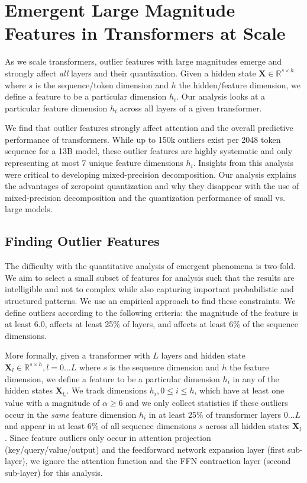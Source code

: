 \documentclass{article}
\begin{document}
\section{Emergent Large Magnitude Features in Transformers at Scale}
\label{sec:emergence}

As we scale transformers, outlier features with large magnitudes emerge and strongly affect {\it all} layers and their quantization. Given a hidden state $\mathbf{X}\in \mathbb{R}^{s\times h}$ where $s$ is the sequence/token dimension and $h$ the hidden/feature dimension, we define a feature to be a particular dimension $h_i$. Our analysis looks at a particular feature dimension $h_i$ across all layers of a given transformer.

We find that outlier features strongly affect attention and the overall predictive performance of transformers. While up to 150k outliers exist per 2048 token sequence for a 13B model, these outlier features are highly systematic and only representing at most 7 unique feature dimensions $h_i$. Insights from this analysis were critical to developing mixed-precision decomposition. Our analysis explains the advantages of zeropoint quantization and why they disappear with the use of mixed-precision decomposition and the quantization performance of small vs. large models.

\subsection{Finding Outlier Features}
\vspace{-0.5em}

The difficulty with the quantitative analysis of emergent phenomena is two-fold. We aim to select a small subset of features for analysis such that the results are intelligible and not to complex while also capturing important probabilistic and structured patterns. We use an empirical approach to find these constraints.
We define outliers according to the following criteria: the magnitude of the feature is at least 6.0, affects at least 25\% of layers, and affects at least 6\% of the sequence dimensions. 

More formally, given a transformer with $L$ layers and hidden state $\mathbf{X}_l\in \mathbb{R}^{s\times h}, l=0...L$ where $s$ is the sequence dimension and $h$ the feature dimension, we define a feature to be a particular dimension $h_i$ in any of the hidden states $\mathbf{X}_{l_{i}}$. We track dimensions $h_i, 0 \leq i \leq h$, which have at least one value with a magnitude of $\alpha\geq6$ and we only collect statistics if these outliers occur in the {\it same} feature dimension $h_i$ in at least 25\% of transformer layers $0...L$ and appear in at least 6\% of all sequence dimensions $s$ across all hidden states $\mathbf{X}_l$. Since feature outliers only occur in attention projection (key/query/value/output) and the feedforward network expansion layer (first sub-layer), we ignore the attention function and the FFN contraction layer (second sub-layer) for this analysis.
\end{document}
